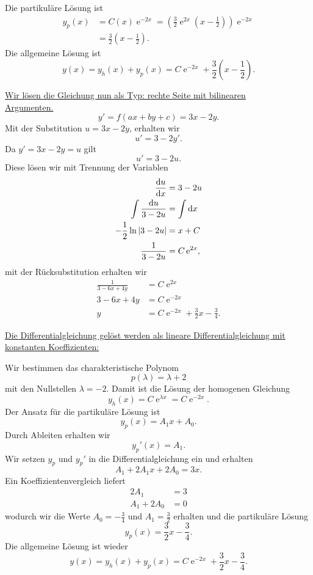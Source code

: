 {\begin{itemize}
Die partikuläre Lösung ist
\begin{align*}
y_p(x) &= C(x) \operatorname{e}^{-2x} = \left( \frac{3}{2} \operatorname{e}^{2x} (x-\frac{1}{2})\right) \operatorname{e}^{-2x}\\
&=\frac{3}{2} (x-\frac{1}{2}).
\end{align*}
Die allgemeine Lösung ist
$$
y(x) = y_h(x) + y_p(x) = C \operatorname{e}^{-2x} + \frac{3}{2} (x-\frac{1}{2}).
$$

\underline{Wir lösen die Gleichung nun als Typ: rechte Seite mit bilinearen}\\
\underline{Argumenten.}
$$
y'=f(ax+by+c)=3x-2y.
$$
Mit der Substitution $u=3x-2y$, erhalten wir
$$
u'= 3 -2y'.
$$
Da $y'=3x-2y=u$ gilt 
$$
u'= 3-2u.
$$
Diese lösen wir mit Trennung der Variablen
\begin{align*}
\frac{\mathrm{d} u}{\mathrm{d} x} &= 3-2u\\
 \int \frac{\mathrm{d} u}{3-2u} &= \int \mathrm{d} x\\
 -\frac{1}{2} \ln |3-2u| &= x + C\\
 \frac{1}{3-2u} &= C\operatorname{e}^{2x},
\end{align*}
mit der Rücksubstitution erhalten wir
\begin{align*}
\frac{1}{3-6x+4y} &= C \operatorname{e}^{2x}\\
3-6x+4y &= C \operatorname{e}^{-2x}\\
y &= C\operatorname{e}^{-2x} +\frac{3}{2}x - \frac{3}{4}.
\end{align*}

\newpage
\underline{Die Differentialgleichung gelöst werden als lineare Differentialgleichung mit}\\
\underline{ konstanten Koeffizienten:}

Wir bestimmen das charakteristische Polynom
$$
p(\lambda) = \lambda + 2
$$
mit den Nullstellen $\lambda = -2$. Damit ist die Lösung der homogenen Gleichung 
$$
y_h(x) = C\operatorname{e}^{\lambda x} = C \operatorname{e}^{-2x}.
$$
Der Ansatz für die partikuläre Lösung ist
$$
y_p(x) = A_1x + A_0.
$$
Durch Ableiten erhalten wir
$$
y_p'(x) = A_1.
$$
Wir setzen $y_p$ und $y_p'$ in die Differentialgleichung ein und erhalten
$$
A_1+2A_1x+2A_0 = 3x.
$$
Ein Koeffizientenvergleich liefert
\begin{align*}
2A_1 &= 3\\
A_1+2A_0 &= 0
\end{align*}
wodurch wir die Werte $A_0 = -\frac{3}{4}$ und $A_1 = \frac{3}{2}$ erhalten und 
die partikuläre Lösung
$$
y_p(x) = \frac{3}{2}x-\frac{3}{4}.
$$
Die allgemeine Lösung ist wieder
$$
y(x) = y_h(x)+y_p(x) = C\operatorname{e}^{-2x} + \frac{3}{2}x-\frac{3}{4}.
$$
\noindent 



\end{itemize}}
